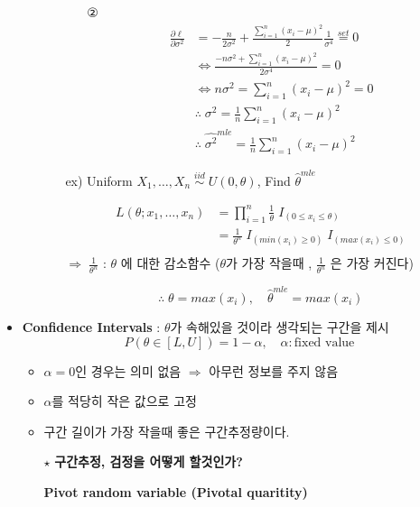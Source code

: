 \documentclass{oblivoir}
\begin{document}
\begin{itemize}
\begin{itemize}
\begin{itemize}
\begin{itemize}
\item[②]
\begin{align*}
\frac{\partial \ell}{\partial \sigma^2} &= - \frac{n}{2\sigma^2} + \frac{\sum_{i=1}^n (x_i - \mu)^2}{2} \frac{1}{\sigma^4} \overset{set}{=} 0 \\
&\Leftrightarrow \frac{-n \sigma^2 + \sum_{i=1}^n (x_i - \mu)^2}{2 \sigma^4} = 0 \\
&\Leftrightarrow n \sigma^2 =  \sum_{i=1}^n (x_i - \mu)^2 = 0 \\
&\therefore \; \sigma^2 = \frac{1}{n}\sum_{i=1}^n (x_i - \mu)^2 \\
&\therefore \; \hat{\sigma^2}^{mle} = \frac{1}{n} \sum_{i=1}^n (x_i - \mu)^2
\end{align*}
\end{itemize}
\item[ex)]
Uniform $X_1, \ldots, X_n \;\overset{iid}{\sim} \; U(0, \theta)$, Find $\hat\theta^{mle}$

\begin{align*}
L(\theta ; x_1, \ldots, x_n) &= \prod_{i=1}^n \frac{1}{\theta} \; I_{(0 \leq x_i \leq \theta)}\\
&= \frac{1}{\theta^n} \; I_{(min(x_i) \geq 0)} \; I_{(max(x_i) \leq 0)} \\ 
\end{align*}
$\Rightarrow \; \frac{1}{\theta^n}$ : $\theta$ 에 대한 감소함수 ($\theta$가 가장 작을때 , $\frac{1}{\theta^n}$ 은 가장 커진다)

$$
\therefore \; \theta = max(x_i) , \quad \hat\theta^{mle} = max(x_i) 
$$
\end{itemize}
\end{itemize}

\item
\textbf{Confidence Intervals} : $\theta$가 속해있을 것이라 생각되는 구간을 제시
$$
P(\theta \in [L,U]) = 1 - \alpha, \quad \alpha : \mbox{fixed value}
$$
\begin{itemize}
\item 
$\alpha = 0$인 경우는 의미 없음 $\Rightarrow$ 아무런 정보를 주지 않음

\item 
$\alpha$를 적당히 작은  값으로 고정

\item 
구간 길이가 가장 작을때 좋은 구간추정량이다.

\item[$\star$]
 \textbf{구간추정, 검정을 어떻게 할것인가?}

\textbf{Pivot random variable (Pivotal quaritity)}


\end{itemize}
\end{itemize}
\end{document}
